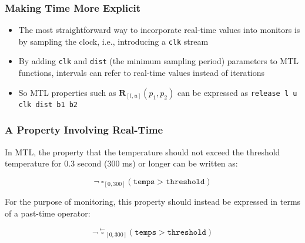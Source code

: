 \documentclass{beamer}
\begin{document}
\begin{frame}[fragile]
\frametitle{Making Time More Explicit}
\begin{itemize}
\item The most straightforward way to incorporate real-time values into monitors
is by sampling the clock, i.e., introducing a \texttt{clk} stream
\item By adding \texttt{clk} and \texttt{dist} (the minimum sampling period) parameters
to MTL functions, intervals can refer to real-time values instead of iterations
\item So MTL properties such as $\mathbf{R}_{[l,u]} (p_1, p_2)$ can be expressed as
\verb,release l u clk dist b1 b2,
\end{itemize}
\end{frame}

\begin{frame}[fragile]
\frametitle{A Property Involving Real-Time}
In MTL, the property that the temperature should not exceed the
threshold temperature for 0.3 second (300 ms) or longer can be written
as:

$$\neg~\square_{[0,300]} (\mathtt{temps} > \mathtt{threshold})$$

For the purpose of monitoring, this property should instead be
expressed in terms of a past-time operator:

$$\neg~\overset{\leftarrow}{\square}_{[0,300]} (\mathtt{temps} > \mathtt{threshold})$$
\end{frame}
\end{document}
